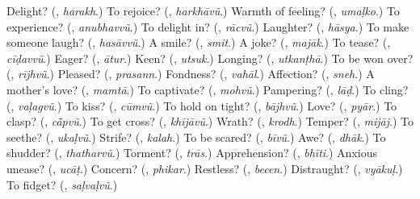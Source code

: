 \begin{tcolorbox}[breakable,colback=teal!4,colframe=teal!35!black,title={Before you move on}]
Delight? (\textbf{}, \emph{harakh}.) To rejoice? (\textbf{}, \emph{harkhāvũ}.) Warmth of feeling? (\textbf{}, \emph{umaḷko}.) To experience? (\textbf{}, \emph{anubhavvũ}.) To delight in? (\textbf{}, \emph{rācvũ}.) Laughter? (\textbf{}, \emph{hāsya}.) To make someone laugh? (\textbf{}, \emph{hasāvvũ}.) A smile? (\textbf{}, \emph{smit}.) A joke? (\textbf{}, \emph{majāk}.) To tease? (\textbf{}, \emph{cīḍavvũ}.) Eager? (\textbf{}, \emph{ātur}.) Keen? (\textbf{}, \emph{utsuk}.) Longing? (\textbf{}, \emph{utkanṭhā}.) To be won over? (\textbf{}, \emph{rījhvũ}.) Pleased? (\textbf{}, \emph{prasann}.) Fondness? (\textbf{}, \emph{vahāl}.) Affection? (\textbf{}, \emph{sneh}.) A mother's love? (\textbf{}, \emph{mamtā}.) To captivate? (\textbf{}, \emph{mohvũ}.) Pampering? (\textbf{}, \emph{lāḍ}.) To cling? (\textbf{}, \emph{vaḷagvũ}.) To kiss? (\textbf{}, \emph{cūmvũ}.) To hold on tight? (\textbf{}, \emph{bājhvũ}.) Love? (\textbf{}, \emph{pyār}.) To clasp? (\textbf{}, \emph{cā̃pvũ}.) To get cross? (\textbf{}, \emph{khījāvũ}.) Wrath? (\textbf{}, \emph{krodh}.) Temper? (\textbf{}, \emph{mijāj}.) To seethe? (\textbf{}, \emph{ukaḷvũ}.) Strife? (\textbf{}, \emph{kalah}.) To be scared? (\textbf{}, \emph{bīvũ}.) Awe? (\textbf{}, \emph{dhāk}.) To shudder? (\textbf{}, \emph{thatharvũ}.) Torment? (\textbf{}, \emph{trās}.) Apprehension? (\textbf{}, \emph{bhīti}.) Anxious unease? (\textbf{}, \emph{ucāṭ}.) Concern? (\textbf{}, \emph{phikar}.) Restless? (\textbf{}, \emph{becen}.) Distraught? (\textbf{}, \emph{vyākuḷ}.) To fidget? (\textbf{}, \emph{saḷvaḷvũ}.)
\end{tcolorbox}
